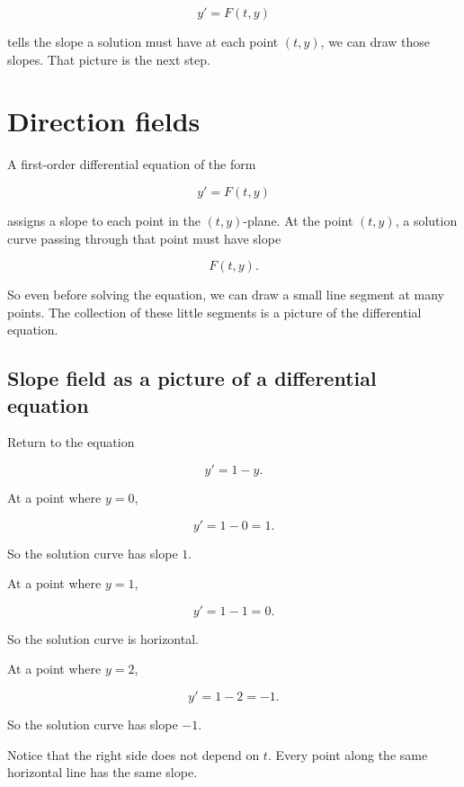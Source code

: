 \[
y'=F(t,y)
\]

tells the slope a solution must have at each point \((t,y)\), we can draw those slopes.
That picture is the next step.

\section{Direction fields}
\label{sec:direction-fields}

A first-order differential equation of the form

\[
y'=F(t,y)
\]

assigns a slope to each point in the \((t,y)\)-plane.  At the point \((t,y)\), a solution
curve passing through that point must have slope

\[
F(t,y).
\]

So even before solving the equation, we can draw a small line segment at many points.
The collection of these little segments is a picture of the differential equation.

\subsection{Slope field as a picture of a differential equation}
\label{subsec:slope-field-picture}

Return to the equation

\[
y'=1-y.
\]

At a point where \(y=0\),

\[
y'=1-0=1.
\]

So the solution curve has slope \(1\).

At a point where \(y=1\),

\[
y'=1-1=0.
\]

So the solution curve is horizontal.

At a point where \(y=2\),

\[
y'=1-2=-1.
\]

So the solution curve has slope \(-1\).

Notice that the right side does not depend on \(t\).  Every point along the same
horizontal line has the same slope.

